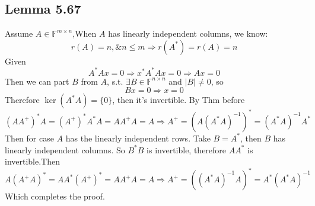 \documentclass[a4paper]{article}
\begin{document}
\subsection*{Lemma 5.67}
Assume $A \in \mathbb{F}^{m\times n}$,When $A$ has linearly independent columns, we know:
\[
r(A) = n, \& n \leqslant m \Rightarrow r(A^*) = r(A) = n
\]
Given
\[
A^*Ax = 0 \Rightarrow x^*A^*Ax = 0\Rightarrow Ax = 0
\]
Then we can part $B$ from $A$, s.t. $\exists B \in \mathbb{F}^{n\times n}$ and $|B| \neq 0$, so
\[
Bx = 0 \Rightarrow x = 0
\]
Therefore $\ker (A^*A) = \{0\}$, then it's invertible.
By Thm before 
\[
(AA^+)^*A = (A^{+})^{*}A^{*}A = AA^+A = A \Rightarrow A^{+} = (A(A^*A)^{-1})^{*}
= (A^*A)^{-1}A^{*}
\]
Then for case $A$ has the linearly independent rows. Take $B = A^*$, then $B$ has linearly independent columns.
So $B^*B$ is invertible, therefore $AA^*$ is invertible.Then
\[
A(A^+A)^* = AA^* (A^{+})^{*}= AA^+A = A \Rightarrow A^{+} = ((A^*A)^{-1}A)^{*}
= A^{*}(A^*A)^{-1}
\] 
Which completes the proof.
\end{document}
